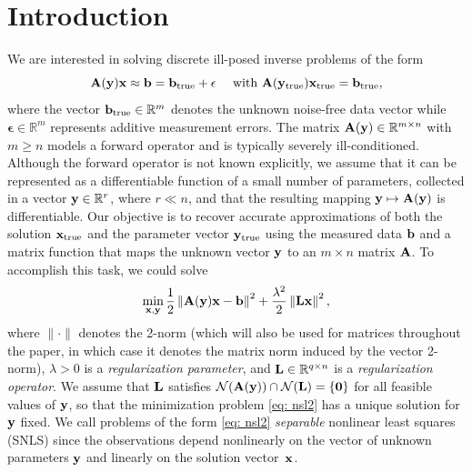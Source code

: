 \documentclass[onefignum,onetabnum]{siamart171218}
\newcommand{\bA}{{\bf A}}
\newcommand{\bL}{{\bf L}}
\newcommand{\bb}{{\bf b}}
\newcommand{\bx}{{\bf x}}
\newcommand{\by}{{\bf y}}
\begin{document}
\section{Introduction} We are interested in solving discrete ill-posed inverse problems of the %
form 
\begin{equation*}
\bA(\by)\bx  \approx \bb =  \bb_{\rm true} + \mathbf{\epsilon} \quad \mbox{ with } \bA( \by_{\rm true}) \bx_{\rm true} = \bb_{\rm true},
\end{equation*}
where %
the vector $\bb_{\rm true} \in \mathbb{R}^m$ denotes the unknown noise-free data vector while $\mathbf{\epsilon} \in \mathbb{R}^m$ represents additive measurement errors. The matrix $\bA(\by) \in \mathbb{R}^{m\times n}$ with $m\geq n$ models a forward operator and is typically severely ill-conditioned. Although the forward operator is not known explicitly, we assume that it can be represented as a differentiable function of a small number of parameters, collected in a vector $\by \in \mathbb{R}^r$, where $r \ll n$, and that the resulting mapping $\by \mapsto \bA(\by)$ is differentiable. Our objective is to recover accurate approximations of both the solution $\bx_{\rm true}$ and the parameter vector $\by_{\rm true}$ using the measured data $\bb$ and a matrix function that maps the unknown vector $\by$ to an $m \times n$ matrix $\bA$. To accomplish this task, we could solve
\begin{equation}\label{eq: nsl2}
\min_{\bx, \by} \frac{1}{2}\left\|\bA(\by)\bx - \bb \right\|^2 + \frac{\lambda^2}{2} \left\|\bL \bx\right\|^2,
\end{equation}
where $\|\cdot\|$ denotes the 2-norm (which will also be used for matrices throughout the paper, in which case it denotes the matrix norm induced by the vector 2-norm), $\lambda>0$ is a \emph{regularization parameter}, and $\bL \in \mathbb{R}^{q\times n}$ is a \emph{regularization operator}. We assume that $\bL$ satisfies $\mathcal{N}(\bA(\by)) \cap \mathcal{N} (\bL) = \{\boldsymbol{0}\}$ for all feasible values of $\by$, so that the minimization problem \eqref{eq: nsl2} has a unique solution for $\by$ fixed. We call %
problems of %
the form \eqref{eq: nsl2}  \emph{separable} nonlinear least squares (SNLS) since the observations depend nonlinearly on the vector of unknown parameters $\by$ and linearly on the solution vector~$\bx$. 
\end{document}
